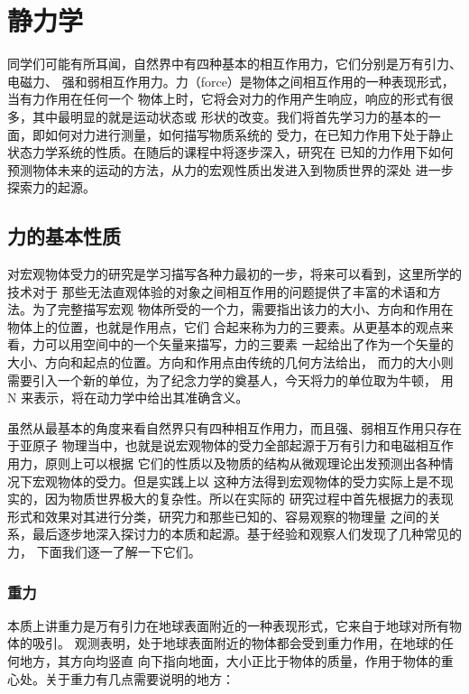 \documentclass[UTF8,zihao=-4,oneside,openany]{ctexbook}
\begin{document}
\setcounter{page}{1}
\chapter{静力学}

同学们可能有所耳闻，自然界中有四种基本的相互作用力，它们分别是万有引力、电磁力、
强和弱相互作用力。力（force）是物体之间相互作用的一种表现形式，当有力作用在任何一个
物体上时，它将会对力的作用产生响应，响应的形式有很多，其中最明显的就是运动状态或
形状的改变。我们将首先学习力的基本的一面，即如何对力进行测量，如何描写物质系统的
受力，在已知力作用下处于静止状态力学系统的性质。在随后的课程中将逐步深入，研究在
已知的力作用下如何预测物体未来的运动的方法，从力的宏观性质出发进入到物质世界的深处
进一步探索力的起源。

\section{力的基本性质}

对宏观物体受力的研究是学习描写各种力最初的一步，将来可以看到，这里所学的技术对于
那些无法直观体验的对象之间相互作用的问题提供了丰富的术语和方法。为了完整描写宏观
物体所受的一个力，需要指出该力的大小、方向和作用在物体上的位置，也就是作用点，它们
合起来称为力的三要素。从更基本的观点来看，力可以用空间中的一个矢量来描写，力的三要素
一起给出了作为一个矢量的大小、方向和起点的位置。方向和作用点由传统的几何方法给出，
而力的大小则需要引入一个新的单位，为了纪念力学的奠基人，今天将力的单位取为牛顿，
用 N 来表示，将在动力学中给出其准确含义。

虽然从最基本的角度来看自然界只有四种相互作用力，而且强、弱相互作用只存在于亚原子
物理当中，也就是说宏观物体的受力全部起源于万有引力和电磁相互作用力，原则上可以根据
它们的性质以及物质的结构从微观理论出发预测出各种情况下宏观物体的受力。但是实践上以
这种方法得到宏观物体的受力实际上是不现实的，因为物质世界极大的复杂性。所以在实际的
研究过程中首先根据力的表现形式和效果对其进行分类，研究力和那些已知的、容易观察的物理量
之间的关系，最后逐步地深入探讨力的本质和起源。基于经验和观察人们发现了几种常见的力，
下面我们逐一了解一下它们。

\clearpage
\subsection{重力}

本质上讲重力是万有引力在地球表面附近的一种表现形式，它来自于地球对所有物体的吸引。
观测表明，处于地球表面附近的物体都会受到重力作用，在地球的任何地方，其方向均竖直
向下指向地面，大小正比于物体的质量，作用于物体的重心处。关于重力有几点需要说明的地方：
\end{document}
